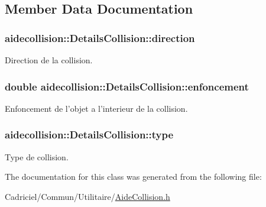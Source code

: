 \subsection{Member Data Documentation}
\hypertarget{classaidecollision_1_1_details_collision_a4ffc7c26ed439fca9cc1b1b77c741ce8}{
\subsubsection[{direction}]{ aidecollision\-::\-Details\-Collision\-::direction}}\label{classaidecollision_1_1_details_collision_a4ffc7c26ed439fca9cc1b1b77c741ce8}


Direction de la collision. 

\hypertarget{classaidecollision_1_1_details_collision_a6aa4cae3f313a2a16608dd60da0f97d1}{
\subsubsection[{enfoncement}]{\setlength{\rightskip}{0pt plus 5cm}double aidecollision\-::\-Details\-Collision\-::enfoncement}}\label{classaidecollision_1_1_details_collision_a6aa4cae3f313a2a16608dd60da0f97d1}


Enfoncement de l'objet a l'interieur de la collision. 

\hypertarget{classaidecollision_1_1_details_collision_a524989691331ea39d2c14c639f0de02e}{
\subsubsection[{type}]{ aidecollision\-::\-Details\-Collision\-::type}}\label{classaidecollision_1_1_details_collision_a524989691331ea39d2c14c639f0de02e}


Type de collision. 



The documentation for this class was generated from the following file\-:\begin{DoxyCompactItemize}
\item 
Cadriciel/\-Commun/\-Utilitaire/\hyperlink{_aide_collision_8h}{Aide\-Collision.\-h}\end{DoxyCompactItemize}
